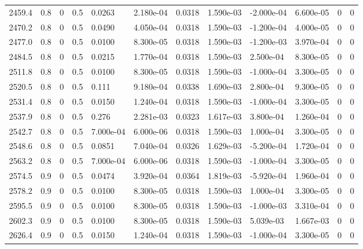 \documentclass[preview]{standalone}
\begin{document}
{{{{{{\begin{tabular}{L{1.2cm}C{1.2cm} C{0.3cm}C{0.5cm} C{1.4cm}C{1.4cm} C{1.4cm}C{1.4cm} C{1.6cm}C{1.6cm} C{1.6cm}C{1.6cm}}
  2459.4  &   0.8  & 0     & 0.5 &  0.0263  & 2.180e-04  &  0.0318&   1.590e-03& -2.000e-04 & 6.600e-05   &  0 & 0  \\ 
  2470.2  &   0.8  & 0     & 0.5 &  0.0490  & 4.050e-04  &  0.0318&   1.590e-03& -1.200e-04 & 4.000e-05   &  0 & 0  \\ 
  2477.0  &   0.8  & 0     & 0.5 &  0.0100  & 8.300e-05  &  0.0318&   1.590e-03& -1.200e-03 & 3.970e-04   &  0 & 0  \\ 
  2484.5  &   0.8  & 0     & 0.5 &  0.0215  & 1.770e-04  &  0.0318&   1.590e-03& 2.500e-04 & 8.300e-05   &  0 & 0  \\ 
  2511.8  &   0.8  & 0     & 0.5 &  0.0100  & 8.300e-05  &  0.0318&   1.590e-03& -1.000e-04 & 3.300e-05   &  0 & 0  \\ 
  2520.5  &   0.8  & 0     & 0.5 &  0.111  & 9.180e-04  &  0.0338&   1.690e-03& 2.800e-04 & 9.300e-05   &  0 & 0  \\ 
  2531.4  &   0.8  & 0     & 0.5 &  0.0150  & 1.240e-04  &  0.0318&   1.590e-03& -1.000e-04 & 3.300e-05   &  0 & 0  \\ 
  2537.9  &   0.8  & 0     & 0.5 &  0.276  & 2.281e-03  &  0.0323&   1.617e-03& 3.800e-04 & 1.260e-04   &  0 & 0  \\ 
  2542.7  &   0.8  & 0     & 0.5 &  7.000e-04  & 6.000e-06  &  0.0318&   1.590e-03& 1.000e-04 & 3.300e-05   &  0 & 0  \\ 
  2548.6  &   0.8  & 0     & 0.5 &  0.0851  & 7.040e-04  &  0.0326&   1.629e-03& -5.200e-04 & 1.720e-04   &  0 & 0  \\ 
  2563.2  &   0.8  & 0     & 0.5 &  7.000e-04  & 6.000e-06  &  0.0318&   1.590e-03& -1.000e-04 & 3.300e-05   &  0 & 0  \\ 
  2574.5  &   0.9  & 0     & 0.5 &  0.0474  & 3.920e-04  &  0.0364&   1.819e-03& -5.920e-04 & 1.960e-04   &  0 & 0  \\ 
  2578.2  &   0.9  & 0     & 0.5 &  0.0100  & 8.300e-05  &  0.0318&   1.590e-03& 1.000e-04 & 3.300e-05   &  0 & 0  \\ 
  2595.5  &   0.9  & 0     & 0.5 &  0.0100  & 8.300e-05  &  0.0318&   1.590e-03& -1.000e-03 & 3.310e-04   &  0 & 0  \\ 
  2602.3  &   0.9  & 0     & 0.5 &  0.0100  & 8.300e-05  &  0.0318&   1.590e-03& 5.039e-03 & 1.667e-03   &  0 & 0  \\ 
  2626.4  &   0.9  & 0     & 0.5 &  0.0150  & 1.240e-04  &  0.0318&   1.590e-03& -1.000e-04 & 3.300e-05   &  0 & 0  \\ 
\hline 
\end{tabular} 

}}}}}}
\end{document}
